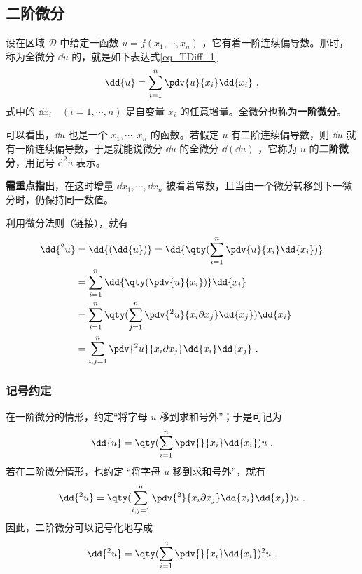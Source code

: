 \subsection{二阶微分}
设在区域 $\mathcal{D}$ 中给定一函数 $u=f(x_1,\cdots,x_n)$ ，它有着一阶连续偏导数。那时，称为全微分 $\dd{u}$ 的，就是如下表达式\autoref{eq_TDiff_1}~
\begin{equation}
\dd{u}=\sum_{i=1}^n \pdv{u}{x_i}\dd{x_i}~.
\end{equation}
式中的 $\dd{x_i}\quad(i=1,\cdots,n)$ 是自变量 $x_i$ 的任意增量。全微分也称为\textbf{一阶微分}。

可以看出，$\dd{u}$ 也是一个 $x_1,\cdots,x_n$ 的函数。若假定 $u$ 有二阶连续偏导数，则 $\dd{u}$ 就有一阶连续偏导数，于是就能说微分 $\dd{u}$ 的全微分 $\dd{(\dd u)}$ ，它称为 $u$ 的\textbf{二阶微分}，用记号 $\mathrm{d}^2u$ 表示。

\textbf{需重点指出}，在这时增量 $\dd{x_1},\cdots,\dd{x_n}$ 被看着常数，且当由一个微分转移到下一微分时，仍保持同一数值。

利用微分法则（链接），就有
\begin{equation}
\begin{aligned}
\dd{^2u}&=\dd{(\dd{u})}=\dd{\qty(\sum_{i=1}^n \pdv{u}{x_i}\dd{x_i})}\\
&=\sum_{i=1}^n \dd{\qty(\pdv{u}{x_i})}\dd{x_i}\\
&=\sum_{i=1}^n\qty(\sum_{j=1}^n\pdv{^2u}{x_i\partial x_j} \dd{x_j})\dd{x_i}\\
&=\sum_{i,j=1}^n\pdv{^2u}{x_i\partial x_j} \dd{x_i}\dd{x_j}~.
\end{aligned}
\end{equation}
\subsubsection{记号约定}
在一阶微分的情形，约定“将字母 $u$ 移到求和号外”；于是可记为
\begin{equation}
\dd{u}=\qty(\sum_{i=1}^n\pdv{}{x_i}\dd{x_i})u~.
\end{equation}
若在二阶微分情形，也约定 “将字母 $u$ 移到求和号外”，就有
\begin{equation}
\dd{^2u}=\qty(\sum_{i,j=1}^n\pdv{^2}{x_i\partial x_j} \dd{x_i}\dd{x_j})u~.
\end{equation}
因此，二阶微分可以记号化地写成
\begin{equation}
\dd{^2u}=\qty(\sum_{i=1}^n\pdv{}{x_i} \dd{x_i})^2u~.
\end{equation}
